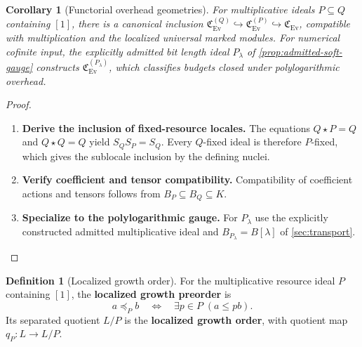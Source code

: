 \documentclass[11pt,a4paper]{article}
\numberwithin{algorithm}{section}
\numberwithin{equation}{section}
\newtheorem{corollary}[corollary]{Corollary}
\theoremstyle{definition}
\newtheorem{definition}[definition]{Definition}
\theoremstyle{remark}
\theoremstyle{plain}
\newcommand{\incl}{\hookrightarrow}
\newcommand{\Ev}{{\operatorname{Ev}}}
\newcommand{\Cplx}{\mathfrak C_{\Ev}}
\theoremstyle{definition}
\theoremstyle{plain}
\begin{document}
\begin{corollary}[Functorial overhead geometries]
\label{cor:nested-gauges}
For multiplicative ideals $P\subseteq Q$ containing $[1]$,
there is a canonical inclusion
$\Cplx^{(Q)}\incl\Cplx^{(P)}\incl\Cplx$, compatible with
multiplication and the localized universal marked modules.
For numerical cofinite input, the explicitly admitted bit length
ideal $P_\lambda$ of \cref{prop:admitted-soft-gauge} constructs
$\Cplx^{(P_\lambda)}$, which classifies budgets closed under
polylogarithmic overhead.
\end{corollary}
\begin{proof}\leavevmode
\begin{enumerate}[leftmargin=*,align=left]
\item \textbf{Derive the inclusion of fixed-resource locales.}
The equations $Q\star P=Q$ and $Q\star Q=Q$ yield
$S_QS_P=S_Q$.  Every $Q$-fixed ideal is therefore $P$-fixed,
which gives the sublocale inclusion by the defining nuclei.

\item \textbf{Verify coefficient and tensor compatibility.}
Compatibility of coefficient actions and tensors follows from
$B_P\subseteq B_Q\subseteq K$.

\item \textbf{Specialize to the polylogarithmic gauge.}
For $P_\lambda$ use the
explicitly constructed admitted multiplicative ideal and
$B_{P_\lambda}=B[\lambda]$ of \cref{sec:transport}.
\end{enumerate}
\end{proof}

\begin{definition}[Localized growth order]\label{def:localized-growth-order}
For the multiplicative resource ideal $P$ containing $[1]$,
the \textbf{localized growth preorder} is
\begin{equation}\label{eq:soft-growth-preorder}
 a\preceq_P b\quad\Longleftrightarrow\quad
 \exists p\in P\;(a\le pb).
\end{equation}
Its separated quotient $L/P$ is the \textbf{localized growth order},
with quotient map $q_P:L\to L/P$.
\end{definition}
\end{document}

